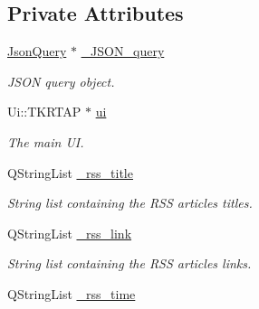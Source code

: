 \subsection*{Private Attributes}
\begin{DoxyCompactItemize}
\item 
\hypertarget{class_t_k_r_t_a_p_a6bbf119b4d676391d255cccff61fd3db}{\hyperlink{class_json_query}{Json\+Query} $\ast$ \hyperlink{class_t_k_r_t_a_p_a6bbf119b4d676391d255cccff61fd3db}{\+\_\+\+J\+S\+O\+N\+\_\+query}}\label{class_t_k_r_t_a_p_a6bbf119b4d676391d255cccff61fd3db}

\begin{DoxyCompactList}\small\item\em J\+S\+O\+N query object. \end{DoxyCompactList}\item 
\hypertarget{class_t_k_r_t_a_p_aa5c0808ed62d03e2429251f24ce9f1ed}{Ui\+::\+T\+K\+R\+T\+A\+P $\ast$ \hyperlink{class_t_k_r_t_a_p_aa5c0808ed62d03e2429251f24ce9f1ed}{ui}}\label{class_t_k_r_t_a_p_aa5c0808ed62d03e2429251f24ce9f1ed}

\begin{DoxyCompactList}\small\item\em The main U\+I. \end{DoxyCompactList}\item 
\hypertarget{class_t_k_r_t_a_p_ae1b640da392aa1223efadd00e9ab18ef}{Q\+String\+List \hyperlink{class_t_k_r_t_a_p_ae1b640da392aa1223efadd00e9ab18ef}{\+\_\+rss\+\_\+title}}\label{class_t_k_r_t_a_p_ae1b640da392aa1223efadd00e9ab18ef}

\begin{DoxyCompactList}\small\item\em String list containing the R\+S\+S articles titles. \end{DoxyCompactList}\item 
\hypertarget{class_t_k_r_t_a_p_a9ff67f4d9206e5a8b76812497c83680e}{Q\+String\+List \hyperlink{class_t_k_r_t_a_p_a9ff67f4d9206e5a8b76812497c83680e}{\+\_\+rss\+\_\+link}}\label{class_t_k_r_t_a_p_a9ff67f4d9206e5a8b76812497c83680e}

\begin{DoxyCompactList}\small\item\em String list containing the R\+S\+S articles links. \end{DoxyCompactList}\item 
\hypertarget{class_t_k_r_t_a_p_aecca4344eb3c1de07ee5d9269dd288ca}{Q\+String\+List \hyperlink{class_t_k_r_t_a_p_aecca4344eb3c1de07ee5d9269dd288ca}{\+\_\+rss\+\_\+time}}\label{class_t_k_r_t_a_p_aecca4344eb3c1de07ee5d9269dd288ca}


\end{DoxyCompactItemize}
